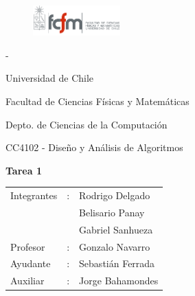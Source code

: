\documentclass[letterpaper,10pt]{article}
\begin{document}
	\begin{titlepage}

		\begin{figure}
			\includegraphics[width=0.3\textwidth]{logoFCFM.png}
		\end{figure}

		\noindent \phantom - %

		Universidad de Chile

		Facultad de Ciencias Físicas y Matemáticas

		Depto. de Ciencias de la Computación

		CC4102 - Diseño y Análisis de Algoritmos

		\vfill

		\begin{center}
			\begin{Huge}
				{\textbf{Tarea 1}}
			\end{Huge}
		\end{center}

		\vfill

		\begin{flushright}
			\begin{tabular}{lll}
				Integrantes	&:	& Rodrigo Delgado\\
						&	& Belisario Panay\\
						&	& Gabriel Sanhueza\\
				Profesor	&:	& Gonzalo Navarro\\
				Ayudante	&:	& Sebastián Ferrada\\
				Auxiliar	&:	& Jorge Bahamondes\\
			\end{tabular}
		\end{flushright}

	\end{titlepage}

	\newpage

	\tableofcontents
\end{document}
